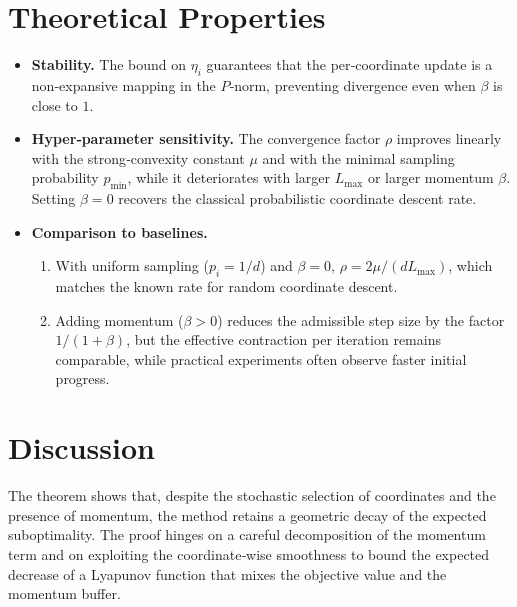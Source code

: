 \documentclass{article}
\begin{document}
\section*{Theoretical Properties}
\begin{itemize}[leftmargin=*]
  \item \textbf{Stability.} The bound on $\eta_i$ guarantees that the per‑coordinate update is a non‑expansive mapping in the $P$‑norm, preventing divergence even when $\beta$ is close to $1$.
  \item \textbf{Hyper‑parameter sensitivity.} The convergence factor $\rho$ improves linearly with the strong‑convexity constant $\mu$ and with the minimal sampling probability $p_{\min}$, while it deteriorates with larger $L_{\max}$ or larger momentum $\beta$. Setting $\beta=0$ recovers the classical probabilistic coordinate descent rate.
  \item \textbf{Comparison to baselines.}
  \begin{enumerate}
    \item With uniform sampling ($p_i=1/d$) and $\beta=0$, $\rho=2\mu/(dL_{\max})$, which matches the known rate for random coordinate descent.
    \item Adding momentum ($\beta>0$) reduces the admissible step size by the factor $1/(1+\beta)$, but the effective contraction per iteration remains comparable, while practical experiments often observe faster initial progress.
  \end{enumerate}
\end{itemize}

\section*{Discussion}
The theorem shows that, despite the stochastic selection of coordinates and the presence of momentum, the method retains a geometric decay of the expected suboptimality. The proof hinges on a careful decomposition of the momentum term and on exploiting the coordinate‑wise smoothness to bound the expected decrease of a Lyapunov function that mixes the objective value and the momentum buffer.

\newpage
\end{document}
